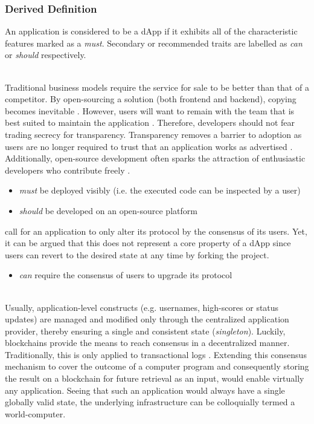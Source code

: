 \subsubsection{Derived Definition}
An application is considered to be a \acf{dApp} if it exhibits all of the characteristic features marked as a \textit{must}. Secondary or recommended traits are labelled as \textit{can} or \textit{should} respectively.

\begin{description}[format={\storedescriptionlabel}]
	\item[Open-source]
	\hfill \\	
	Traditional business models require the service for sale to be better than that of a competitor. By open-sourcing a solution (both frontend and backend), copying becomes inevitable \cite[p.~10]{Raval.2016}. However, users will want to remain with the team that is best suited to maintain the application \cite[p.~11]{Raval.2016}. Therefore, developers should not fear trading secrecy for transparency. Transparency removes a barrier to adoption as users are no longer required to trust that an application works as advertised \cite[p.~9]{Raval.2016}. Additionally, open-source development often sparks the attraction of enthusiastic developers who contribute freely \cite[p.~11]{Raval.2016}.
	
	\begin{itemize}
  		\item \textit{must} be deployed visibly (i.e. the executed code can be inspected by a user)
  		\item \textit{should} be developed on an open-source platform
	\end{itemize}
	
	\citeauthor{Johnston2015} call for an application to only alter its protocol by the consensus of its users. Yet, it can be argued that this does not represent a core property of a \ac{dApp} since users can revert to the desired state at any time by forking the project.

	\begin{itemize}
  		\item \textit{can} require the consensus of users to upgrade its protocol
	\end{itemize}

	\item[Decentralized \label{decentralizedConsensus} consensus]
	\hfill \\
	Usually, application-level constructs (e.g. usernames, high-scores or status updates) are managed and modified only through the centralized application provider, thereby ensuring a single and consistent state (\textit{singleton}). Luckily, blockchains provide the means to reach consensus in a decentralized manner. Traditionally, this is only applied to transactional logs \cite[p.~1]{bitcoin}. Extending this consensus mechanism to cover the outcome of a computer program and consequently storing the result on a blockchain for future retrieval as an input, would enable virtually any application. Seeing that such an application would always have a single globally valid state, the underlying infrastructure can be colloquially termed a world-computer.
	

\end{description}
